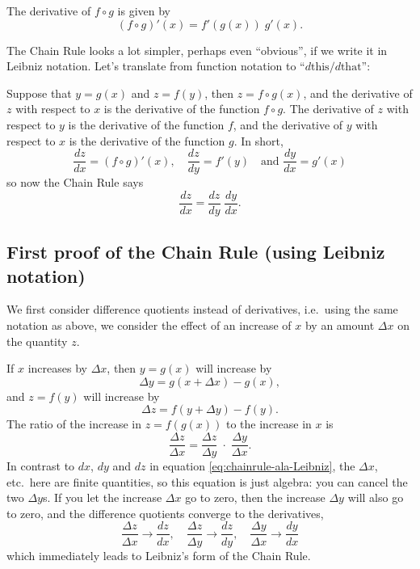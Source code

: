 The derivative of $f\circ g$ is given by
\[
(f\circ g)'(x) = f'(g(x))\;g'(x).
\]\upshape








The Chain Rule looks a lot simpler, perhaps even ``obvious'', if we write it in
Leibniz notation.  Let's translate from function notation to ``$d\text{this}
/d\text{that}$'':




Suppose that $y=g(x)$ and $z=f(y)$, then $z=f\circ g(x)$, and
the derivative of $z$ with respect to $x$ is the derivative of the function
$f\circ g$.  The derivative of $z$ with respect to $y$ is the derivative of the
function $f$, and the derivative of $y$ with respect to $x$ is the derivative of
the function $g$.  In short,
\[
\frac{dz}{dx} =(f\circ g)'(x),\quad
\frac{dz}{dy} = f'(y) \quad\text{and }
\frac{dy}{dx} = g'(x)
\]
so now the Chain Rule says
\begin{equation}\label{eq:chainrule-ala-Leibniz}
  \frac{dz}{dx} = \frac{dz}{dy} \; \frac{dy}{dx}.
\end{equation}
\subsection{First proof of the Chain Rule (using Leibniz notation)} 




We first consider difference quotients instead of derivatives, i.e.\ using the
same notation as above, we consider the effect of an increase of $x$ by an
amount $\Delta x$ on the quantity $z$.




If $x$ increases by $\Delta x$, then $y=g(x)$ will increase by
\[
\Delta y = g(x+\Delta x) - g(x),
\]
and $z=f(y)$ will increase by
\[
\Delta z = f(y+\Delta y) -f(y).
\]
The ratio of the increase in $z=f(g(x))$ to the increase in $x$ is
\[
\frac{\Delta z}{\Delta x} = \frac{\Delta z}{\Delta y} \;\cdot\; \frac{\Delta
  y}{\Delta x}.
\]
In contrast to $dx$, $dy$ and $dz$ in equation \eqref{eq:chainrule-ala-Leibniz},
the $\Delta x$, etc.\ here are finite quantities, so this equation is just
algebra: you can cancel the two $\Delta y$s.  If you let the increase $\Delta x$
go to zero, then the increase $\Delta y$ will also go to zero, and the
difference quotients converge to the derivatives,
\[
\frac{\Delta z}{\Delta x} \longrightarrow \frac{dz}{dx},\quad \frac{\Delta
  z}{\Delta y} \longrightarrow \frac{dz}{dy},\quad \frac{\Delta y}{\Delta x}
\longrightarrow \frac{dy}{dx}
\]
which immediately leads to Leibniz's form of the Chain Rule.
 


